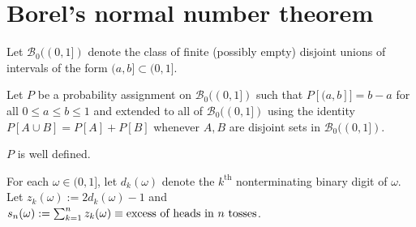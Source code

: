 



%
%
\section{Borel's normal number theorem}
\label{Bsec}




\begin{definition}
\label{fb}
Let $\mathcal B_0((0,1])$ denote the class of finite (possibly empty) disjoint unions of intervals of the form  $(a,b]\subset (0,1]$.
\end{definition}

\begin{definition}
\label{l1defP}
Let $P$  be a probability assignment on $\mathcal B_0((0,1])$ such that $P[(a,b]]=b-a$ for all $0\leq a\leq b\leq 1$ and extended to all of $\mathcal B_0((0,1])$ using the identity $P[A\cup B]=P[A]+P[B]$ whenever $A,B$ are disjoint sets in $ \mathcal B_0((0,1])$.
\end{definition}

\begin{theorem}
$P$ is well defined.
\end{theorem}


\begin{definition}
For each $\omega\in(0,1]$, let $d_k(\omega)$ denote the $k^\text{th}$ nonterminating binary digit of $\omega$. Let $z_k(\omega):=2d_k(\omega)-1$ and $s_n(\omega):=\sum_{k=1}^nz_k(\omega)\equiv\text{\rm excess of heads in $n$ tosses}$.
\end{definition}

